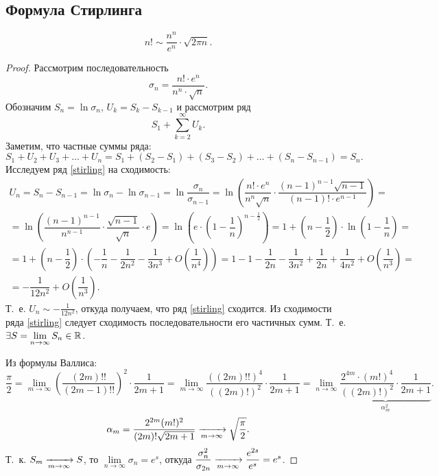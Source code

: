 \documentclass[../../main.tex]{subfiles}
\begin{document}
\subsection{Формула Стирлинга}
\begin{thm}
\[
n! \sim \dfrac{n^n}{e^n}\cdot\sqrt{2\pi n}.
\]
\end{thm}

\begin{proof}
Рассмотрим последовательность
\[\sigma_n = \dfrac{n! \cdot e^n}{n^n \cdot \sqrt{n}}.\]
Обозначим $ S_n = \ln{\sigma_n}$, $U_k = S_k - S_{k-1}$ и рассмотрим ряд
\begin{equation}
\label{stirling} S_1 + \sum\limits_{k=2}^\infty U_k.
\end{equation}
Заметим, что частные суммы ряда:
\[ 
S_1 + U_2 + U_3 + \ldots + U_n = S_1 + \left(S_2 - S_1\right) + 
\left(S_3 - S_2\right) + \ldots + \left(S_n - S_{n - 1}\right) = S_n.
\]
Исследуем ряд \eqref{stirling} на сходимость:
\begin{gather*}
U_n = S_n - S_{n - 1} = \ln\sigma_n - \ln\sigma_{n - 1} = 
\ln\dfrac{\sigma_n}{\sigma_{n - 1}} = \ln\left(\dfrac{n! \cdot 
e^n}{n^n\sqrt{n}}
\cdot \dfrac{(n - 1)^{n - 1}\sqrt{n - 1}}{(n - 1)! \cdot e^{n -1}}\right) =
\\
= \ln\left(\dfrac{(n - 1)^{n - 1}}{n^{n - 1}} \cdot \dfrac{\sqrt{n - 
1}}{\sqrt{n}}
\cdot e\right) = \ln \left(e\cdot \left(1 - \dfrac{1}{n} \right)^{n - 
\frac{1}{2}}\right) = 
1 + \left(n - \dfrac{1}{2} \right) \cdot\ln \left( 1 - \dfrac{1}{n} \right) =
\\
= 1 + \left( n - \dfrac{1}{2} \right)\cdot\left(-\dfrac{1}{n} - \dfrac{1}{2n^2}
- \dfrac{1}{3n^3} + O\left(\dfrac{1}{n^4} \right) \right) = 
1 - 1 - \dfrac{1}{2n} - \dfrac{1}{3n^2} + \dfrac{1}{2n} + \dfrac{1}{4n^2}
+ O\left( \dfrac{1}{n^3} \right) = 
\\
= -\dfrac{1}{12n^2} + O\left( \dfrac{1}{n^3}\right).
\end{gather*}
Т.~е. $U_n \sim -\frac{1}{12n^2}$, откуда получаем, что ряд \eqref{stirling} 
сходится.
Из сходимости ряда \eqref{stirling} следует сходимость
последовательности его частичных сумм. Т.~е. $ \exists 
S = \lim\limits_{n\to\infty} S_n \in \mathbb{R}$.

Из формулы Валлиса:
\[
\dfrac{\pi}{2} = \lim\limits_{m \to \infty} \left( \dfrac{(2m)!!}{(2m - 1)!!}
\right)^2\cdot \dfrac{1}{2m + 1} =
\lim\limits_{m \to \infty} \dfrac{((2m)!!)^4}{((2m)!)^2} \cdot
\dfrac{1}{2m + 1} = \lim\limits_{n \to \infty} 
\underbrace{\dfrac{2^{4m}\cdot(m!)^4}{((2m)!)^2} 
\cdot \dfrac{1}{2m + 1}}_{\alpha_m^2}.
\]
\[
\alpha_m = \dfrac{2^{2m}(m!)^2}{(2m)!\sqrt{2m + 1}} \xrightarrow[m\to\infty]{} 
\sqrt{\dfrac{\pi}{2}}.
\]
Т.~к. $ S_m \xrightarrow[m\to\infty]{} S $, то $ \lim\limits_{n \to \infty} \sigma_n = 
e^s$, откуда 
$\dfrac{\sigma_n^2}{\sigma_{2n}} \xrightarrow[m\to\infty]{}  \dfrac{e^{2s}}{e^s} = e^s 
$.


\end{proof}
\end{document}
